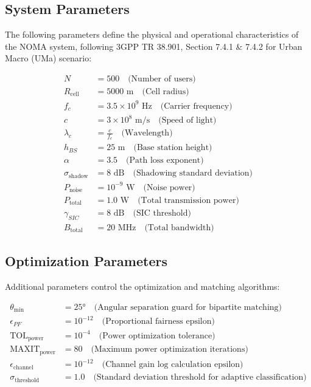 \documentclass[12pt,a4paper]{article}
\begin{document}
\subsection{System Parameters}

The following parameters define the physical and operational characteristics of the NOMA system, following 3GPP TR 38.901, Section 7.4.1 \& 7.4.2 for Urban Macro (UMa) scenario:

\begin{align}
N &= 500 \quad \text{(Number of users)} \\
R_{\text{cell}} &= 5000 \text{ m} \quad \text{(Cell radius)} \\
f_c &= 3.5 \times 10^9 \text{ Hz} \quad \text{(Carrier frequency)} \\
c &= 3 \times 10^8 \text{ m/s} \quad \text{(Speed of light)} \\
\lambda_c &= \frac{c}{f_c} \quad \text{(Wavelength)} \\
h_{BS} &= 25 \text{ m} \quad \text{(Base station height)} \\
\alpha &= 3.5 \quad \text{(Path loss exponent)} \\
\sigma_{\text{shadow}} &= 8 \text{ dB} \quad \text{(Shadowing standard deviation)} \\
P_{\text{noise}} &= 10^{-9} \text{ W} \quad \text{(Noise power)} \\
P_{\text{total}} &= 1.0 \text{ W} \quad \text{(Total transmission power)} \\
\gamma_{SIC} &= 8 \text{ dB} \quad \text{(SIC threshold)} \\
B_{\text{total}} &= 20 \text{ MHz} \quad \text{(Total bandwidth)}
\end{align}

\subsection{Optimization Parameters}

Additional parameters control the optimization and matching algorithms:

\begin{align}
\theta_{\min} &= 25° \quad \text{(Angular separation guard for bipartite matching)} \\
\epsilon_{PF} &= 10^{-12} \quad \text{(Proportional fairness epsilon)} \\
\text{TOL}_{\text{power}} &= 10^{-4} \quad \text{(Power optimization tolerance)} \\
\text{MAXIT}_{\text{power}} &= 80 \quad \text{(Maximum power optimization iterations)} \\
\epsilon_{\text{channel}} &= 10^{-12} \quad \text{(Channel gain log calculation epsilon)} \\
\sigma_{\text{threshold}} &= 1.0 \quad \text{(Standard deviation threshold for adaptive classification)}
\end{align}
\end{document}
